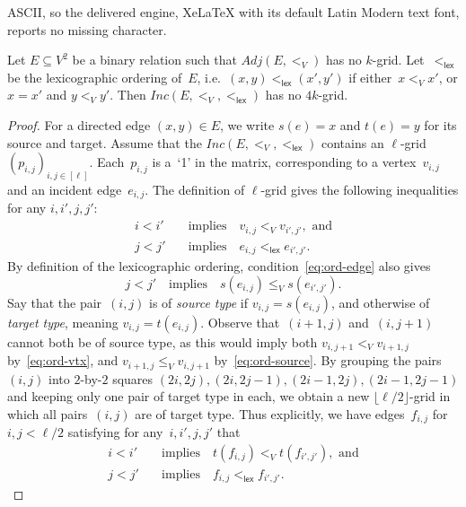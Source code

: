 \documentclass[10pt,a4paper]{amsart}
\newcommand{\adj}{Adj}
\newcommand{\floor}[1]{\lfloor #1 \rfloor}
\newcommand{\inc}{Inc}
\newcommand{\lex}{\mathsf{lex}}
\begin{document}
ASCII, so the delivered engine, XeLaTeX with its default Latin Modern text font, reports no missing character.
\begin{lemma}\label{lem:incidence-matrix-grid}
    Let $E \subseteq V^2$ be a binary relation such that $\adj(E,<_V)$ has no $k$-grid.
    Let~$<_\lex$ be the lexicographic ordering of~$E$, i.e.\ $(x,y) <_\lex (x',y')$ if either~$x <_V x'$, or $x = x'$ and $y <_V y'$.
    Then $\inc(E,<_V,<_\lex)$ has no $4k$-grid.
\end{lemma}

\begin{proof}
    For a directed edge $(x,y) \in E$, we write $s(e) = x$ and $t(e) = y$ for its source and target.
    Assume that the $Inc(E,<_V,<_\lex)$ contains an $\ell$-grid $(p_{i,j})_{i,j \in [\ell]}$.
    Each~$p_{i,j}$ is a~`1' in the matrix, corresponding to a vertex~$v_{i,j}$ and an incident edge~$e_{i,j}$. The definition of $\ell$-grid gives the following inequalities for any $i,i',j,j'$:
    \begin{align}
        \label{eq:ord-vtx} i<i' \quad & \text{implies} \quad v_{i,j} <_V v_{i',j'}, \text{ and}  \\
        \label{eq:ord-edge} j<j' \quad & \text{implies} \quad e_{i,j} <_\lex e_{i',j'}.
    \end{align}
    By definition of the lexicographic ordering, condition~\eqref{eq:ord-edge} also gives 
    \begin{equation}
        \label{eq:ord-source}
        j<j' \quad \text{implies} \quad s(e_{i,j}) \le_V s(e_{i',j'}).
    \end{equation}
    Say that the pair~$(i,j)$ is of \emph{source type} if $v_{i,j} = s(e_{i,j})$, and otherwise of \emph{target type}, meaning $v_{i,j} = t(e_{i,j})$.
    Observe that~$(i+1,j)$ and~$(i,j+1)$ cannot both be of source type, as this would imply both $v_{i,j+1} <_V v_{i+1,j}$ by~\eqref{eq:ord-vtx}, and $v_{i+1,j} \le_V v_{i,j+1}$ by~\eqref{eq:ord-source}.
    By grouping the pairs~$(i,j)$ into $2$-by-$2$ squares $(2i,2j),(2i,2j-1),(2i-1,2j),(2i-1,2j-1)$
    and keeping only one pair of target type in each, we obtain a new $\floor{\ell/2}$-grid in which all pairs~$(i,j)$ are of target type.
    Thus explicitly, we have edges~$f_{i,j}$ for~$i,j < \ell/2$ satisfying for any~$i,i',j,j'$ that
    \begin{align}
        \label{eq:ord-tgt} i<i' \quad & \text{implies} \quad t(f_{i,j}) <_V t(f_{i',j'}), \text{ and}  \\
        \label{eq:ord-edge2} j<j' \quad & \text{implies} \quad f_{i,j} <_\lex f_{i',j'}.

\end{align}
\end{proof}
\end{document}

